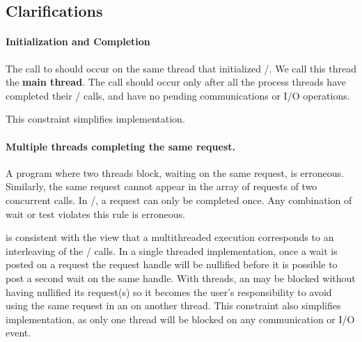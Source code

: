 \subsection{Clarifications}

\paragraph{Initialization and Completion}

The call to  should occur on the same thread
that 
initialized \MPI/. We call this thread the {\bf main
thread}.  The call should occur only after all the process threads
have completed their \MPI/ calls, and have no pending communications
or I/O operations.

\begin{rationale}
This constraint simplifies implementation.
\end{rationale}

\paragraph{Multiple threads completing the same request.}
A program where two threads block, waiting on the same
request, is erroneous.  Similarly, the same request cannot appear in
the array of requests of two concurrent 
%
%
%
%
%
%
calls.
In \mpi/, a request can only be completed once.  Any combination of
wait or test  violates this rule is erroneous.

\begin{rationale}
 is consistent with the view that a multithreaded execution
corresponds to an interleaving of the \MPI/ calls.
In a single threaded implementation, once a wait is
posted on a request
the request handle will be nullified before it is possible to
post a second wait on the same handle.
%
%
%
With threads, an 
may be blocked without having nullified its request(s) so it
becomes the user's responsibility to avoid using the same request
in an  on another thread.
This constraint also simplifies
implementation, as only one thread will be blocked on any
communication or I/O event.
\end{rationale}

